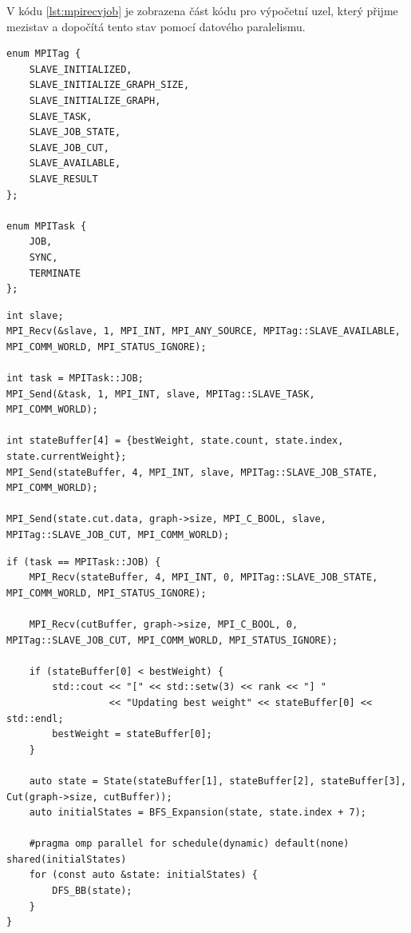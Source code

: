 \documentclass[epsf,epic,eepic,eepicemu]{article}\oddsidemargin=-5mm
\begin{document}
V kódu \ref{lst:mpirecvjob} je zobrazena část kódu pro výpočetní uzel, který přijme mezistav a dopočítá tento stav pomocí datového paralelismu.

\begin{lstlisting}[float,label=lst:mpitags, caption={MPI tagy a specifické tasky}]
enum MPITag {
    SLAVE_INITIALIZED,
    SLAVE_INITIALIZE_GRAPH_SIZE,
    SLAVE_INITIALIZE_GRAPH,
    SLAVE_TASK,
    SLAVE_JOB_STATE,
    SLAVE_JOB_CUT,
    SLAVE_AVAILABLE,
    SLAVE_RESULT
};

enum MPITask {
    JOB,
    SYNC,
    TERMINATE
};
\end{lstlisting}

\begin{lstlisting}[float,label=lst:mpisendjob, caption={MPI tagy a specifické tasky}]
int slave;
MPI_Recv(&slave, 1, MPI_INT, MPI_ANY_SOURCE, MPITag::SLAVE_AVAILABLE, MPI_COMM_WORLD, MPI_STATUS_IGNORE);

int task = MPITask::JOB;
MPI_Send(&task, 1, MPI_INT, slave, MPITag::SLAVE_TASK, MPI_COMM_WORLD);

int stateBuffer[4] = {bestWeight, state.count, state.index, state.currentWeight};
MPI_Send(stateBuffer, 4, MPI_INT, slave, MPITag::SLAVE_JOB_STATE, MPI_COMM_WORLD);

MPI_Send(state.cut.data, graph->size, MPI_C_BOOL, slave, MPITag::SLAVE_JOB_CUT, MPI_COMM_WORLD);
\end{lstlisting}

\begin{lstlisting}[float,label=lst:mpirecvjob, caption={MPI přijmutí mezistavu a zahájení výpočtu}]
if (task == MPITask::JOB) {
    MPI_Recv(stateBuffer, 4, MPI_INT, 0, MPITag::SLAVE_JOB_STATE, MPI_COMM_WORLD, MPI_STATUS_IGNORE);

    MPI_Recv(cutBuffer, graph->size, MPI_C_BOOL, 0, MPITag::SLAVE_JOB_CUT, MPI_COMM_WORLD, MPI_STATUS_IGNORE);

    if (stateBuffer[0] < bestWeight) {
        std::cout << "[" << std::setw(3) << rank << "] "
                  << "Updating best weight" << stateBuffer[0] << std::endl;
        bestWeight = stateBuffer[0];
    }

    auto state = State(stateBuffer[1], stateBuffer[2], stateBuffer[3], Cut(graph->size, cutBuffer));
    auto initialStates = BFS_Expansion(state, state.index + 7);

    #pragma omp parallel for schedule(dynamic) default(none) shared(initialStates)
    for (const auto &state: initialStates) {
        DFS_BB(state);
    }
}
\end{lstlisting}
\end{document}
